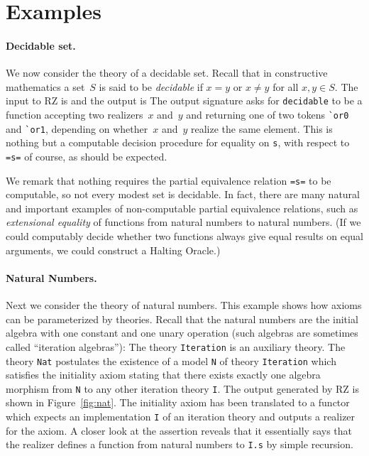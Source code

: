 \section{Examples}
\label{sec:examples}

\paragraph{Decidable set.}
\label{sec:decidable-set}

We now consider the theory of a decidable set.
Recall that in constructive mathematics a set~$S$ is said to be
\emph{decidable} if $x = y$ or $x \neq y$ for all $x, y \in S$.
The input to RZ is
%
{\small{}}%
%
\noindent
and the output is
%
{\small{}}
%
\noindent
The output signature asks for \Verb|decidable| to be a function
accepting two realizers~$x$ and~$y$ and returning one of two tokens
\Verb|`or0| and \Verb|`or1|, depending on whether~$x$ and~$y$ realize
the same element. This is nothing but a computable decision procedure
for equality on \Verb|s|, with respect to \Verb|=s=| of course, as
should be expected.

We remark that nothing requires the partial equivalence relation
\Verb|=s=| to be computable, so not every modest set is decidable. In
fact, there are many natural and important examples of non-computable partial
equivalence relations, such as \emph{extensional equality} of functions
from natural numbers to natural numbers. (If we could computably
decide whether two functions always give equal results on equal
arguments, we could construct a Halting Oracle.)

\paragraph{Natural Numbers.}
\label{sec:natural-numb}

Next we consider the theory of natural numbers. This example shows how
axioms can be parameterized by theories. Recall that the natural
numbers are the initial algebra with one constant and one unary
operation (such algebras are sometimes called ``iteration algebras''):
%
{\small{}}%
%
\noindent
The theory \Verb|Iteration| is an auxiliary theory. The theory
\Verb|Nat| postulates the existence of a model \Verb|N| of theory
\Verb|Iteration| which satisfies the initiality axiom stating that
there exists exactly one algebra morphism from \Verb|N| to any other
iteration theory \Verb|I|. The output generated by RZ is shown in
Figure~\ref{fig:nat}. The initiality axiom has been translated to a
functor which expects an implementation \Verb|I| of an iteration
theory and outputs a realizer for the axiom. A closer look at the
assertion reveals that it essentially says that the realizer defines a
function from natural numbers to \Verb|I.s| by simple recursion.

